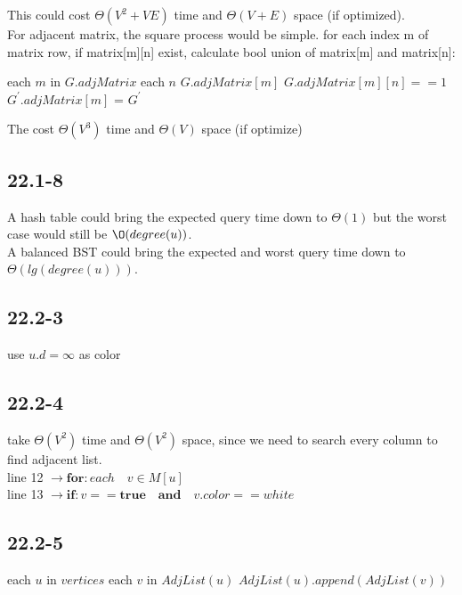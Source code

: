 \documentclass[]{article}
\begin{document}
This could cost $\Theta(V^2 + VE)$ time and $\Theta(V+E)$ space (if optimized).\\

For adjacent matrix, the square process would be simple. for each index m of matrix row, if matrix[m][n] exist, calculate bool union of matrix[m] and matrix[n]:

\begin{codebox}
	
	\li \For each $m$ in $G.adjMatrix$
	\li \Do \For each $n$ $G.adjMatrix[m]$
	\li 	\Do \If $G.adjMatrix[m][n] == 1$
	\li         \Then $G^{'}.adjMatrix[m]$ = 
	\End
	\End
	\End
	\li \Return $G^{'}$
\end{codebox}

The  cost $\Theta(V^3)$ time and $\Theta(V)$ space (if optimize)

\subsection{22.1-8}
A hash table could bring the expected query time down to $\Theta(1)$ but the worst case would still be $\O(degree(u))$. \\
A balanced BST could bring the expected and worst query time down to $\Theta(lg(degree(u)))$.

\subsection{22.2-3}
use $u.d = \infty$ as color

\subsection{22.2-4}
take $\Theta (V^2)$ time and $\Theta (V^2)$ space, since we need to search every column to find adjacent list.\\
line 12 $\rightarrow \textbf{for}: each \quad v \in M[u]$\\
line 13 $\rightarrow \textbf {if}: v == \textbf{true} \quad \textbf{and} \quad v.color == white $

\subsection{22.2-5}

\begin{codebox}
	
	\li \For each $u$ in $vertices$
	\li		\Do \For each $v$ in $AdjList(u)$
	\li 		\Do $AdjList(u).append(AdjList(v))$
	\End
	\End
\end{codebox}
\end{document}
